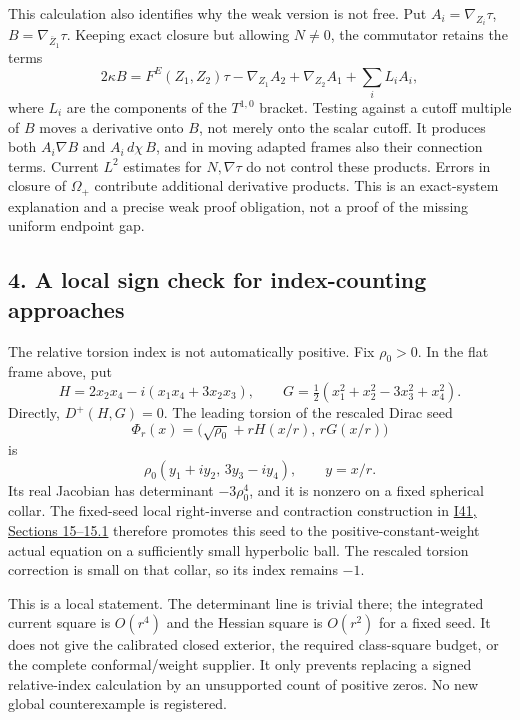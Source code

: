 \documentclass[
  10pt,
]{article}
\begin{document}
This calculation also identifies why the weak version is not free. Put
\(A_i=\nabla_{Z_i}\tau\), \(B=\nabla_{\overline Z_1}\tau\). Keeping
exact closure but allowing \(N\ne0\), the commutator retains the terms
\[
 2\kappa B
   =F^E(Z_1,Z_2)\tau-\nabla_{Z_1}A_2+\nabla_{Z_2}A_1
                                      +\sum_i L_iA_i,         \tag{3.8}
\] where \(L_i\) are the components of the \(T^{1,0}\) bracket. Testing
against a cutoff multiple of \(B\) moves a derivative onto \(B\), not
merely onto the scalar cutoff. It produces both \(A_i\nabla B\) and
\(A_i\,d\chi\,B\), and in moving adapted frames also their connection
terms. Current \(L^2\) estimates for \(N,\nabla\tau\) do not control
these products. Errors in closure of \(\Omega_+\) contribute additional
derivative products. This is an exact-system explanation and a precise
weak proof obligation, not a proof of the missing uniform endpoint gap.

\hypertarget{a-local-sign-check-for-index-counting-approaches}{%
\subsection{4. A local sign check for index-counting
approaches}\label{a-local-sign-check-for-index-counting-approaches}}

The relative torsion index is not automatically positive. Fix
\(\rho_0>0\). In the flat frame above, put \[
 H=2x_2x_4-i(x_1x_4+3x_2x_3),\qquad
 G=\tfrac12(x_1^2+x_2^2-3x_3^2+x_4^2).
\] Directly, \(D^+(H,G)=0\). The leading torsion of the rescaled Dirac
seed \[
 \Phi_r(x)=\bigl(\sqrt{\rho_0}+rH(x/r),\,rG(x/r)\bigr)
\] is \[
 \rho_0(y_1+iy_2,\,3y_3-iy_4),\qquad y=x/r.
\] Its real Jacobian has determinant \(-3\rho_0^4\), and it is nonzero
on a fixed spherical collar. The fixed-seed local right-inverse and
contraction construction in
\href{20260927_conformal_separation_and_zero_end.md}{I41, Sections
15--15.1} therefore promotes this seed to the positive-constant-weight
actual equation on a sufficiently small hyperbolic ball. The rescaled
torsion correction is small on that collar, so its index remains \(-1\).

This is a local statement. The determinant line is trivial there; the
integrated current square is \(O(r^4)\) and the Hessian square is
\(O(r^2)\) for a fixed seed. It does not give the calibrated closed
exterior, the required class-square budget, or the complete
conformal/weight supplier. It only prevents replacing a signed
relative-index calculation by an unsupported count of positive zeros. No
new global counterexample is registered.
\end{document}
